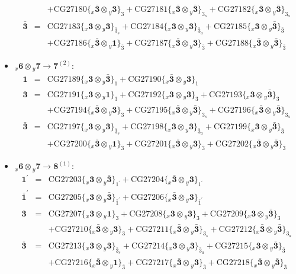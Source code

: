 \documentclass[english]{article}
\newcommand{\rep}[1]{\mathbf{#1}}
\newcommand{\repx}[2]{{}_{#2}\mathbf{#1}}
\newcommand{\subcg}[3]{\big\{ \repx{#1}{x}\otimes\repx{#2}{y}\big\}^{}_{#3}}
\begin{document}
\begin{itemize}
\begin{eqnarray*}
 & & +\text{CG27180}\subcg{\bar{3}}{3}{3}+\text{CG27181}\subcg{\bar{3}}{\bar{3}}{3_{s}}+\text{CG27182}\subcg{\bar{3}}{\bar{3}}{3_{a}}
\\
\rep{\bar{3}} &=& \text{CG27183}\subcg{3}{3}{\bar{3}_{s}}+\text{CG27184}\subcg{3}{3}{\bar{3}_{a}}+\text{CG27185}\subcg{3}{\bar{3}}{\bar{3}} \\ 
 & & +\text{CG27186}\subcg{\bar{3}}{1}{\bar{3}}+\text{CG27187}\subcg{\bar{3}}{3}{\bar{3}}+\text{CG27188}\subcg{\bar{3}}{\bar{3}}{\bar{3}}
\end{eqnarray*}
\item $\repx{6}{x}\otimes\repx{7}{y}\to\rep{7}^{(2)}$:
\begin{eqnarray*}
\rep{1} &=& \text{CG27189}\subcg{3}{\bar{3}}{1}+\text{CG27190}\subcg{\bar{3}}{3}{1}
\\
\rep{3} &=& \text{CG27191}\subcg{3}{1}{3}+\text{CG27192}\subcg{3}{3}{3}+\text{CG27193}\subcg{3}{\bar{3}}{3} \\ 
 & & +\text{CG27194}\subcg{\bar{3}}{3}{3}+\text{CG27195}\subcg{\bar{3}}{\bar{3}}{3_{s}}+\text{CG27196}\subcg{\bar{3}}{\bar{3}}{3_{a}}
\\
\rep{\bar{3}} &=& \text{CG27197}\subcg{3}{3}{\bar{3}_{s}}+\text{CG27198}\subcg{3}{3}{\bar{3}_{a}}+\text{CG27199}\subcg{3}{\bar{3}}{\bar{3}} \\ 
 & & +\text{CG27200}\subcg{\bar{3}}{1}{\bar{3}}+\text{CG27201}\subcg{\bar{3}}{3}{\bar{3}}+\text{CG27202}\subcg{\bar{3}}{\bar{3}}{\bar{3}}
\end{eqnarray*}
\item $\repx{6}{x}\otimes\repx{7}{y}\to\rep{8}^{(1)}$:
\begin{eqnarray*}
\rep{1^{\prime}} &=& \text{CG27203}\subcg{3}{\bar{3}}{1^{\prime}}+\text{CG27204}\subcg{\bar{3}}{3}{1^{\prime}}
\\
\rep{\bar{1}^{\prime}} &=& \text{CG27205}\subcg{3}{\bar{3}}{\bar{1}^{\prime}}+\text{CG27206}\subcg{\bar{3}}{3}{\bar{1}^{\prime}}
\\
\rep{3} &=& \text{CG27207}\subcg{3}{1}{3}+\text{CG27208}\subcg{3}{3}{3}+\text{CG27209}\subcg{3}{\bar{3}}{3} \\ 
 & & +\text{CG27210}\subcg{\bar{3}}{3}{3}+\text{CG27211}\subcg{\bar{3}}{\bar{3}}{3_{s}}+\text{CG27212}\subcg{\bar{3}}{\bar{3}}{3_{a}}
\\
\rep{\bar{3}} &=& \text{CG27213}\subcg{3}{3}{\bar{3}_{s}}+\text{CG27214}\subcg{3}{3}{\bar{3}_{a}}+\text{CG27215}\subcg{3}{\bar{3}}{\bar{3}} \\ 
 & & +\text{CG27216}\subcg{\bar{3}}{1}{\bar{3}}+\text{CG27217}\subcg{\bar{3}}{3}{\bar{3}}+\text{CG27218}\subcg{\bar{3}}{\bar{3}}{\bar{3}}

\end{eqnarray*}
\end{itemize}
\end{document}
